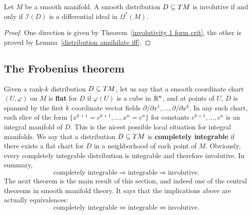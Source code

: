 \begin{proposition}\label{involutivity differential ideal crit}
Let $M$ be a smooth manifold. A smooth distribution $D\subseteq TM$ is involutive if and only if $\mathcal{I}(D)$ is a differential ideal in $\Omega^*(M)$.
\end{proposition}
\begin{proof}
One direction is given by Theorem~\ref{involutivity 1 form crit}, the other is proved by Lemma~\ref{distribution annihilate iff}.
\end{proof}
\subsection{The Frobenius theorem}
Given a rank-$k$ distribution $D\subseteq TM$, let us say that a smooth coordinate chart $(U,\varphi)$ on $M$ is \textbf{flat} for $D$ if $\varphi(U)$ is a cube in $\mathbb{R}^n$, and at points of $U$, $D$ is spanned by the first $k$ coordinate vector fields $\partial/\partial x^1,\dots,\partial/\partial x^k$. In any such chart, each slice of the form $\{x^{k+1}=c^{k+1},\dots,x^n=c^n\}$ for constants $c^{k+1},\dots,c^n$ is an integral manifold of $D$. This is the nicest possible local situation for integral manifolds. We say that a distribution $D\subseteq TM$ is \textbf{completely integrable} if there exists a flat chart for $D$ in a neighborhood of each point of $M$. Obviously, every completely integrable distribution is integrable and therefore involutive. In summary,
\[\text{completely integrable}\Longrightarrow\text{integrable}\Longrightarrow\text{involutive}.\]
The next theorem is the main result of this section, and indeed one of the central theorems in smooth manifold theory. It says that the implications above are actually equivalences:
\[\text{completely integrable}\iff\text{integrable}\iff\text{involutive}.\]
